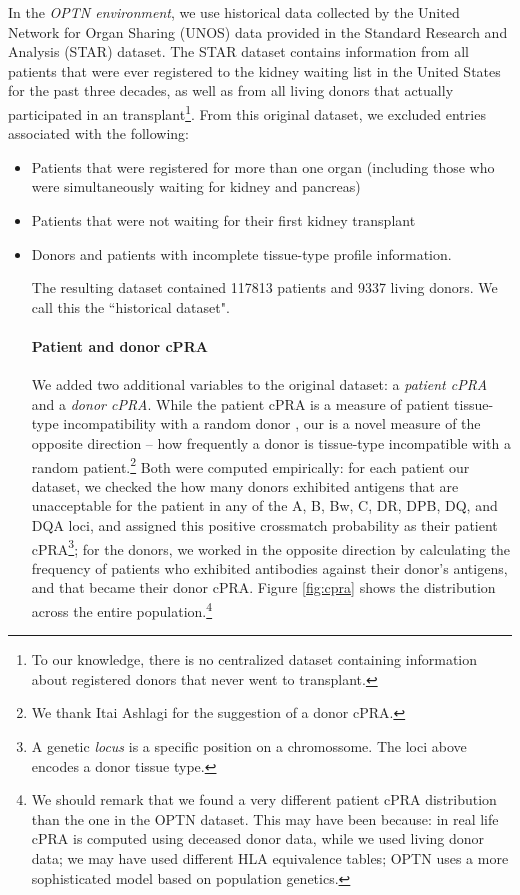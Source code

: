 In the \emph{OPTN environment}, we use historical data collected by the United Network for Organ Sharing (UNOS) data provided in the Standard Research and Analysis (STAR) dataset. The STAR dataset contains information from all patients that were ever registered to the kidney waiting list in the United States for the past three decades, as well as from all living donors that actually participated in an transplant\footnote{To our knowledge, there is no centralized dataset containing information about registered donors that never went to transplant.}. From this original dataset, we excluded entries associated with the following:

\begin{itemize} 
  \item Patients that were registered for more than one organ (including those who were simultaneously waiting for kidney and pancreas)
  \item Patients that were not waiting for their first kidney transplant
  \item Donors and patients with incomplete tissue-type profile information.
  
The resulting dataset contained 117813 patients and 9337 living donors. We call this the ``historical dataset".

\paragraph{Patient and donor cPRA} We added two additional variables to the original dataset: a \emph{patient cPRA} and a \emph{donor cPRA}. While the patient cPRA is a measure of patient tissue-type incompatibility with a random donor \cite{cecka2010calculated}, our  is a novel measure of the opposite direction -- how frequently a donor is tissue-type incompatible with a random patient.\footnote{We thank Itai Ashlagi for the suggestion of a donor cPRA.} Both were computed empirically: for each patient our dataset, we checked the how many donors exhibited antigens that are unacceptable for the patient in any of the A, B, Bw, C, DR, DPB, DQ, and DQA loci, and assigned this positive crossmatch probability as their patient cPRA\footnote{A genetic \emph{locus} is a specific position on a chromossome. The loci above encodes a donor tissue type.}; for the donors, we worked in the opposite direction by calculating the frequency of patients who exhibited antibodies against their donor's antigens, and that became their donor cPRA. Figure \ref{fig:cpra} shows the distribution across the entire population.\footnote{We should remark that we found a very different patient cPRA distribution than the one in the OPTN dataset. This may have been because: in real life cPRA is computed using deceased donor data, while we used living donor data; we may have used different HLA equivalence tables; OPTN uses a more sophisticated model based on population genetics.\cite{optn2013cpra}}



\end{itemize}
